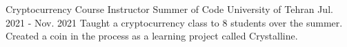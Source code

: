 



\begin{cventries}

  \tchentry
    {Cryptocurrency Course Instructor} %
    {Summer of Code} %
    {University of Tehran} %
    {Jul. 2021 - Nov. 2021} %
    {
      Taught a cryptocurrency class to 8 students over the summer. Created a coin in the process as a learning project called Crystalline.
    }

\end{cventries}

\vspace{2.0mm}


